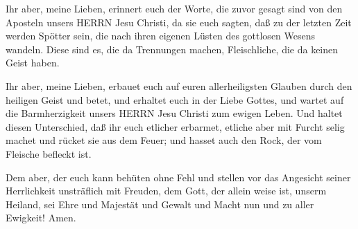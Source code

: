  Ihr aber, meine Lieben, erinnert euch der Worte, die zuvor
gesagt sind von den Aposteln unsers HERRN Jesu Christi,  da
sie euch sagten, daß zu der letzten Zeit werden Spötter sein, die nach
ihren eigenen Lüsten des gottlosen Wesens wandeln.  Diese
sind es, die da Trennungen machen, Fleischliche, die da keinen Geist
haben.

 Ihr aber, meine Lieben, erbauet euch auf euren
allerheiligsten Glauben durch den heiligen Geist und betet,
 und erhaltet euch in der Liebe Gottes, und wartet auf die
Barmherzigkeit unsers HERRN Jesu Christi zum ewigen Leben. 
Und haltet diesen Unterschied, daß ihr euch etlicher erbarmet,
 etliche aber mit Furcht selig machet und rücket sie aus
dem Feuer; und hasset auch den Rock, der vom Fleische befleckt ist.

 Dem aber, der euch kann behüten ohne Fehl und stellen vor
das Angesicht seiner Herrlichkeit unsträflich mit Freuden, 
dem Gott, der allein weise ist, unserm Heiland, sei Ehre und Majestät
und Gewalt und Macht nun und zu aller Ewigkeit! Amen.
